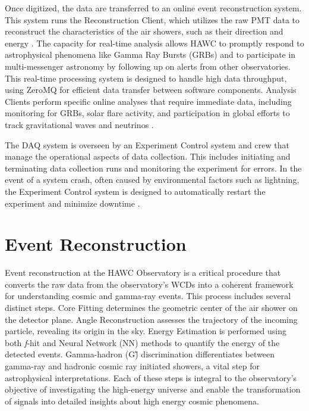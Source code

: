 Once digitized, the data are transferred to an online event reconstruction system.
This system runs the Reconstruction Client, which utilizes the raw PMT data to reconstruct the characteristics of the air showers, such as their direction and energy \cite{HAWC_DAQ_NIM}.
The capacity for real-time analysis allows HAWC to promptly respond to astrophysical phenomena like Gamma Ray Bursts (GRBs) and to participate in multi-messenger astronomy by following up on alerts from other observatories.
This real-time processing system is designed to handle high data throughput, using ZeroMQ \cite{zeromq} for efficient data transfer between software components.
Analysis Clients perform specific online analyses that require immediate data, including monitoring for GRBs, solar flare activity, and participation in global efforts to track gravitational waves and neutrinos \cite{nim:hawc_detect}.

The DAQ system is overseen by an Experiment Control system and crew that manage the operational aspects of data collection.
This includes initiating and terminating data collection runs and monitoring the experiment for errors.
In the event of a system crash, often caused by environmental factors such as lightning, the Experiment Control system is designed to automatically restart the experiment and minimize downtime \cite{nim:hawc_detect,HAWC_DAQ_NIM}.

\section{Event Reconstruction} \label{sec:hawc_reconstruction}

Event reconstruction at the HAWC Observatory is a critical procedure that converts the raw data from the observatory's WCDs into a coherent framework for understanding cosmic and gamma-ray events.
This process includes several distinct steps.
Core Fitting determines the geometric center of the air shower on the detector plane.
Angle Reconstruction assesses the trajectory of the incoming particle, revealing its origin in the sky.
Energy Estimation is performed using both \textit{f}-hit and Neural Network (NN) methods to quantify the energy of the detected events.
Gamma-hadron (G\H) discrimination differentiates between gamma-ray and hadronic cosmic ray initiated showers, a vital step for astrophysical interpretations.
Each of these steps is integral to the observatory's objective of investigating the high-energy universe and enable the transformation of signals into detailed insights about high energy cosmic phenomena.

